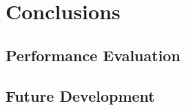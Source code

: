 \documentclass[12pt, a4paper]{report}
\begin{document}
\newpage



\newpage{}

\chapter{Conclusions}


\section{Performance Evaluation} 


\section{Future Development}


\renewcommand{\bibname}{Bibliography}

\end{document}

